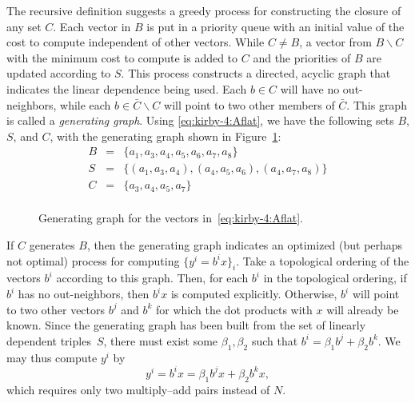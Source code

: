 The recursive definition suggests a greedy process for constructing
the closure of any set $ C $. Each vector in $B$ is put in a priority
queue with an initial value of the cost to compute independent of other
vectors. While $C \ne B$, a vector from $B \backslash C$ with the
minimum cost to compute is added to $C$ and the priorities of $B$ are
updated according to $S$. This process constructs a directed, acyclic
graph that indicates the linear dependence being used. Each $ b \in C
$ will have no out-neighbors, while each $ b \in \bar{C} \backslash C
$ will point to two other members of $ \bar{C} $. This graph is
called a \emph{generating graph}. Using \eqref{eq:kirby-4:Aflat}, we
have the following sets $B$, $S$, and $C$, with the generating graph
shown in Figure~\ref{fig:kirby-4:gg}:
\begin{equation}
\begin{array}{rcl}
 B & = &  \{a_1, a_3, a_4, a_5, a_6, a_7, a_8\} \\
 S & = & \{(a_1, a_3, a_4),(a_4, a_5, a_6), (a_4, a_7, a_8)\} \\
 C & = & \{a_3, a_4, a_5, a_7\} \\
\end{array}
\end{equation}

\begin{figure}
\centering
  \caption{Generating graph for the vectors in~\eqref{eq:kirby-4:Aflat}.}
  \label{fig:kirby-4:gg}
  \vspace*{-6pt}
\end{figure}

If $C$ generates $B$, then the generating graph indicates an optimized
(but perhaps not optimal) process for computing $\{ y^i = b^i x \}_i$.
Take a topological ordering of the vectors $b^i$ according to this
graph. Then, for each $b^i$ in the topological ordering, if $b^i$ has
no out-neighbors, then $b^i x$ is computed explicitly. Otherwise,
$b^i$ will point to two other vectors $b^j$ and $b^k$ for which the
dot products with $x$ will already be known. Since the generating
graph has been built from the set of linearly dependent triples~$S$,
there must exist some $\beta_1, \beta_2$ such that $b^i = \beta_1 b^j
+ \beta_2 b^k$. We may thus compute $y^i$ by
\begin{equation}
y^i = b^i x = \beta_1 b^j x
+ \beta_2  b^k  x,
\end{equation}
which requires only two multiply--add pairs instead of $ N $.

